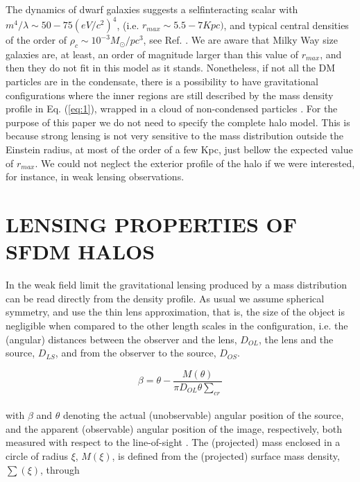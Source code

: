 \documentclass[8pt,letterpaper,twocolumn]{article}
\begin{document}
The dynamics of dwarf galaxies suggests a selfinteracting scalar with $m^4/\lambda \sim 50 - 75(eV/c^2)^4$, (i.e. $r_{max} \sim 5.5 - 7Kpc)$, and typical central densities of the order of  $\rho_c \sim 10^{-3} M_{\odot}/pc^3 $, see Ref. \cite{PhysRevD.68.023511}. We are aware that Milky Way size galaxies are, at least, an order of magnitude larger than this value of $r_{max}$, and then they do not fit in this model as it stands. Nonetheless, if not all the DM particles are in the condensate, there is a possibility to have gravitational configurations where the inner regions are still described by the mass density profile in Eq. (\ref{eq:1}), wrapped in a cloud of non-condensed particles \cite{Bili__2000}. For the purpose of this paper we do not need to specify the complete halo model. This is because strong lensing is not very sensitive to the mass distribution outside the Einstein radius, at most of the order of a few Kpc, just bellow the expected value of $r_{max}$. We could not neglect the exterior profile of the halo if we were interested, for instance, in weak lensing observations.\\


\section{LENSING PROPERTIES OF SFDM HALOS}
\vspace{3mm}
In the weak field limit the gravitational lensing produced by a mass distribution can be read directly from the density profile. As usual we assume spherical symmetry, and use the thin lens approximation, that is, the size of the object is negligible when compared to the other length scales in the configuration, i.e. the (angular) distances between the observer and the lens, $D_{OL}$, the lens and the source, $D_{LS}$, and from the observer to the source,
$D_{OS}$.

\begin{equation} \label{eq:2}
\beta = \theta - \frac{M(\theta)}{\pi D_{OL} \theta {\textstyle \sum}_{cr}}
\end{equation}
\\
with $\beta$ and $\theta$ denoting the actual (unobservable) angular position of the source, and the apparent (observable) angular position of the image, respectively, both measured with respect to the line-of-sight \cite{Kling_2008}. The (projected) mass enclosed in a circle of radius $\xi$, $M(\xi)$, is defined from the (projected) surface mass density, $\sum(\xi)$, through
\end{document}
